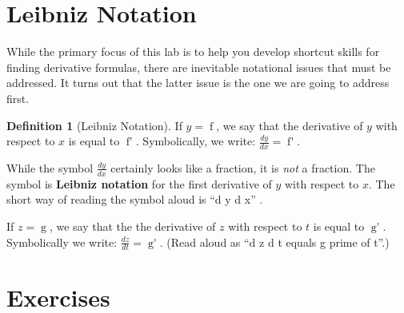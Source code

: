 \documentclass[12pt,]{book}
\newcommand{\terminology}[1]{\textbf{#1}}
\theoremstyle{plain}
\theoremstyle{definition}
\newtheorem{definition}[theorem]{Definition}
\numberwithin{equation}{section}
\newcommand{\fe}[2]{\mathop{{#1}{\left(#2\right)}}}
\newcommand{\fd}[1]{#1'}
\newcommand{\lz}[2]{\frac{d#1}{d#2}}
\begin{document}
\section[Leibniz Notation]{Leibniz Notation}\label{section-leibniz-notation}
While the primary focus of this lab is to help you develop shortcut skills for finding derivative formulas, there are inevitable notational issues that must be addressed.  It turns out that the latter issue is the one we are going to address first.%
\begin{definition}[Leibniz Notation]\label{definition-9}
If \(y=\fe{f}{x}\), we say that the derivative of \(y\) with respect to \(x\) is equal to \(\fe{\fd{f}}{x}\). Symbolically, we write: \(\lz{y}{x}=\fe{\fd{f}}{x}\).%
\par
While the symbol \(\lz{y}{x}\) certainly looks like a fraction, it is \emph{not} a fraction.  The symbol is \terminology{Leibniz notation} for the first derivative of \(y\) with respect to \(x\).  The short way of reading the symbol aloud is ``d y d x''%
.

            \par
If \(z=\fe{g}{t}\), we say that the the derivative of \(z\) with respect to \(t\) is equal to \(\fe{\fd{g}}{t}\).  Symbolically we write: \(\lz{z}{t}=\fe{\fd{g}}{t}\). (Read aloud as ``d z d t equals g prime of t''.)%
\end{definition}
\typeout{************************************************}
\typeout{************************************************}
\section*{Exercises}\label{exercises-27}
\end{document}
